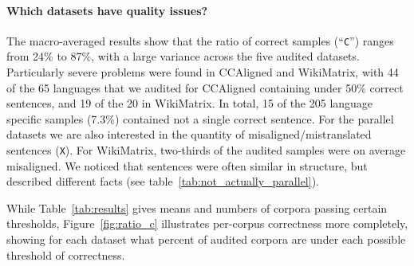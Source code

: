 \paragraph{Which datasets have quality issues?}
The macro-averaged results show that the ratio of correct samples (``\texttt{C}'') ranges from 24\% to 87\%, with a large variance across the five audited datasets.
Particularly severe problems were found in CCAligned and WikiMatrix, with 44 of the 65 languages that we audited for CCAligned containing under 50\% correct sentences, and 19 of the 20 in WikiMatrix. In total, 15 of the 205 language specific samples (7.3\%) contained not a single correct sentence.
For the parallel datasets we are also interested in the quantity of misaligned/mistranslated sentences (\texttt{X}). For WikiMatrix, two-thirds of the audited samples were on average misaligned. We noticed that sentences were often similar in structure, but described different facts (see table~\ref{tab:not_actually_parallel}).

While Table~\ref{tab:results} gives means and numbers of corpora passing certain thresholds, Figure~\ref{fig:ratio_c} illustrates per-corpus correctness more completely, showing for each dataset what percent of audited corpora are under each possible threshold of correctness.

